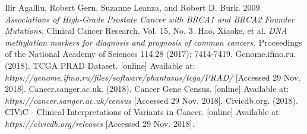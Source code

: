 \documentclass[a4paper,oneside]{article}
\begin{document}
\begin{thebibliography}{1}
 Ilir Agalliu, Robert Gern, Suzanne Leanza, and Robert D. Burk. 2009. {\em Associations of High-Grade Prostate Cancer with BRCA1 and BRCA2 Founder Mutations.} Clinical Cancer Research. Vol. 15, No. 3.
 Hao, Xiaoke, et al. {\em DNA methylation markers for diagnosis and prognosis of common cancers.} Proceedings of the National Academy of Sciences 114.28 (2017): 7414-7419.
 Genome.ifmo.ru. (2018). TCGA PRAD Dataset. [online] Available at: {\em https://genome.ifmo.ru/files/software/phantasus/tcga/PRAD/ } [Accessed 29 Nov. 2018].
 Cancer.sanger.ac.uk. (2018). Cancer Gene Census. [online] Available at: {\em https://cancer.sanger.ac.uk/census } [Accessed 29 Nov. 2018].
 Civicdb.org. (2018). CIViC - Clinical Interpretations of Variants in Cancer. [online] Available at: {\em https://civicdb.org/releases } [Accessed 29 Nov. 2018].
\end{thebibliography}
\end{document}
